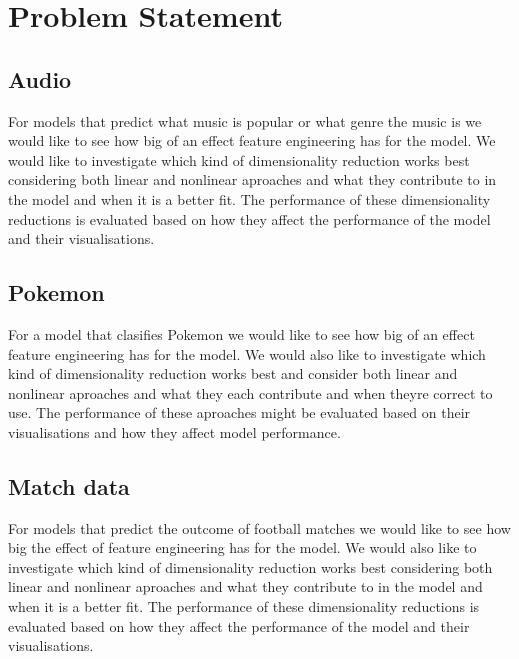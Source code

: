 \section{Problem Statement}\label{sec:problem-statement}
\subsection{Audio} 
For models that predict what music is popular or what genre the music is we would like to see how big of an effect feature engineering has for the model. We would like to investigate which kind of dimensionality reduction works best considering both linear and nonlinear aproaches and what they contribute to in the model and when it is a better fit. The performance of these dimensionality reductions is evaluated based on how they affect the performance of the model and their visualisations.

\subsection{Pokemon}
For a model that clasifies Pokemon we would like to see how big of an effect feature engineering has for the model. We would also like to investigate which kind of dimensionality reduction works best and consider both linear and nonlinear aproaches and what they each contribute and when theyre correct to use. The performance of these aproaches might be evaluated based on their visualisations and how they affect model performance.

\subsection{Match data}
For models that predict the outcome of football matches we would like to see how big the effect of feature engineering has for the model. We would also like to investigate which kind of dimensionality reduction works best considering both linear and nonlinear aproaches and what they contribute to in the model and when it is a better fit. The performance of these dimensionality reductions is evaluated based on how they affect the performance of the model and their visualisations.